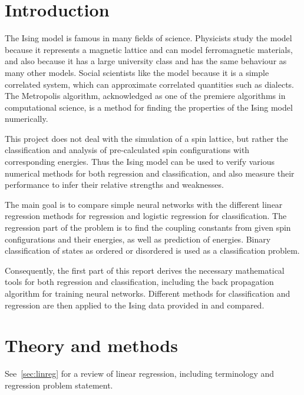 \documentclass[11pt,british,a4paper]{article}
\numberwithin{equation}{section}
\begin{document}
\tableofcontents

\section{Introduction}
The Ising model is famous in many fields of science.
Physicists study the model because it represents a magnetic lattice and can model ferromagnetic materials, and also because it has a large university class and has the same behaviour as many other models.
Social scientists like the model because it is a simple correlated system, which can approximate correlated quantities such as dialects.
The Metropolis algorithm, acknowledged as one of the premiere algorithms in computational science, is a method for finding the properties of the Ising model numerically.

This project does not deal with the simulation of a spin lattice, but rather the classification and analysis of pre-calculated spin configurations with corresponding energies.
Thus the Ising model can be used to verify various numerical methods for both regression and classification, and also measure their performance to infer their relative strengths and weaknesses.

The main goal is to compare simple neural networks with the different linear regression methods for regression and logistic regression for classification.
The regression part of the problem is to find the coupling constants from given spin configurations and their energies, as well as prediction of energies.
Binary classification of states as ordered or disordered is used as a classification problem.

Consequently, the first part of this report derives the necessary mathematical tools for both regression and classification, including the back propagation algorithm for training neural networks. Different methods for classification and regression are then applied to the Ising data provided in\cite{mehta} and compared.

\section{Theory and methods}
See~\vref{sec:linreg} for a review of linear regression, including terminology and regression problem statement.
\end{document}
